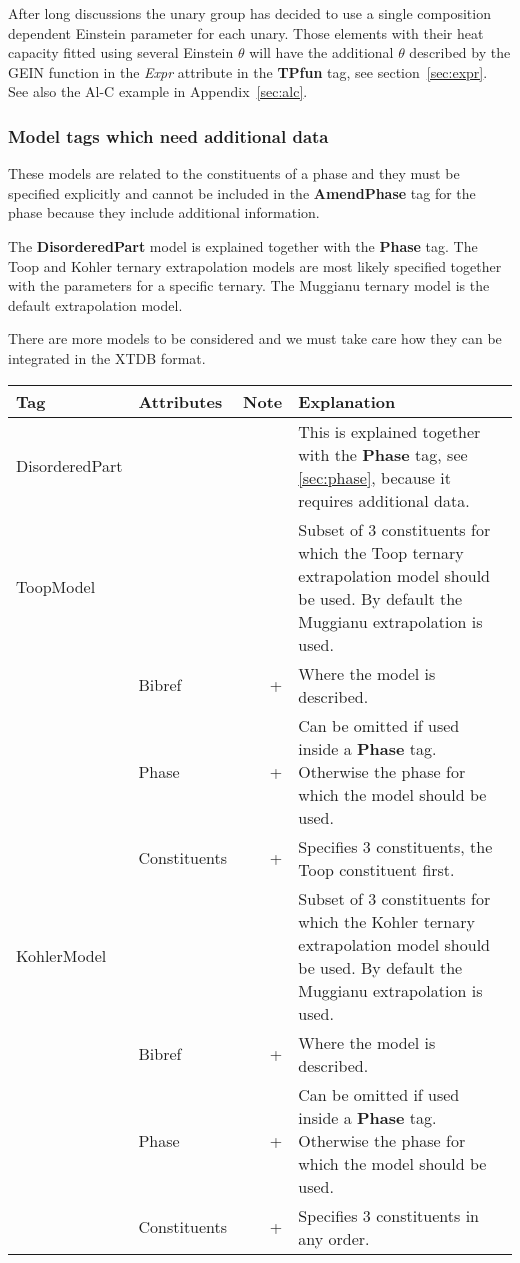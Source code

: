 \documentclass{article}
\begin{document}
\bigskip
After long discussions the unary group has decided to use a single
composition dependent Einstein parameter for each unary.  Those
elements with their heat capacity fitted using several Einstein
$\theta$ will have the additional $\theta$ described by the GEIN
function in the {\em Expr} attribute in the {\bf TPfun} tag, see
section~\ref{sec:expr}.  See also the Al-C example in
Appendix~\ref{sec:alc}.

\newpage 

\subsubsection{Model tags which need additional data}\label{sec:toop}

These models are related to the constituents of a phase and they must
be specified explicitly and cannot be included in the {\bf AmendPhase}
tag for the phase because they include additional information.

The {\bf DisorderedPart} model is explained together with the {\bf
  Phase} tag.  The Toop and Kohler ternary extrapolation models are
most likely specified together with the parameters for a specific
ternary.  The Muggianu ternary model is the default extrapolation
model.

There are more models to be considered and we must take care how they
can be integrated in the XTDB format.

\bigskip
\begin{tabular}{|p{} p{} r p{}|}\hline
  Tag & Attributes & Note & Explanation\\\hline

  DisorderedPart & & & This is explained together with the {\bf Phase} tag,
                   see \ref{sec:phase}, because it 
                   requires additional data.\\\hline

  ToopModel & & & Subset of 3 constituents for which the Toop ternary extrapolation model should be used.    By default the Muggianu extrapolation is used.\\
      & Bibref & + & Where the model is described.\\
      & Phase & + & Can be omitted if used inside a {\bf Phase} tag.  Otherwise the phase for which the model should be used.\\
      & Constituents & + & Specifies 3 constituents, the Toop constituent first.\\\hline

  KohlerModel & &  & Subset of 3 constituents for which the Kohler ternary extrapolation model should be used.  By default the Muggianu extrapolation is used.\\
      & Bibref & + & Where the model is described.\\
      & Phase & + & Can be omitted if used inside a {\bf Phase} tag.  Otherwise the phase for which the model should be used.\\
      & Constituents & + & Specifies 3 constituents in any order.\\\hline

\end{tabular}
\end{document}
